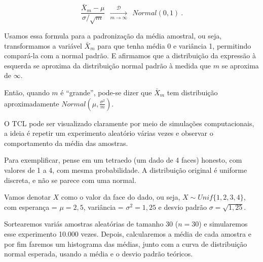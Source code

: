 \documentclass[
]{book}
\begin{document}
\[
\frac{\bar{X}_m-\mu}{\sigma/\sqrt{m}} ~~\xrightarrow[m\rightarrow\infty]{\mathcal{D}}~~ Normal(0,1)~.
\]

Usamos essa formula para a padronização da média amostral, ou seja, transformamos a variável \(\bar{X}_m\) para que tenha média 0 e variância 1, permitindo compará-la com a normal padrão. E afirmamos que a distribuição da expressão à esquerda se aproxima da distribuição normal padrão à medida que \(m\) se aproxima de \(\infty\).

Então, quando \(m\) é ``grande'', pode-se dizer que \(\bar{X}_m\) tem distribuição aproximadamente \(Normal\left(\mu,\frac{\sigma^2}{m}\right)\).

O TCL pode ser visualizado claramente por meio de simulações computacionais, a ideia é repetir um experimento aleatório várias vezes e observar o comportamento da média das amostras.

Para exemplificar, pense em um tetraedo (um dado de 4 faces) honesto, com valores de 1 a 4, com mesma probabilidade. A distribuição original é uniforme discreta, e não se parece com uma normal.

Vamos denotar \(X\) como o valor da face do dado, ou seja, \(X \sim Unif\{1,2,3,4\}\), com esperança = \(\mu = 2,5\), variância = \(\sigma^2 = 1,25\) e desvio padrão \(\sigma = \sqrt{1,25}\).

Sortearemos variás amostras aleatórias de tamanho 30 (\(n=30\)) e simularemos esse experimento 10.000 vezes. Depois, calcularemos a média de cada amostra e por fim faremos um histograma das médias, junto com a curva de distribuição normal esperada, usando a média e o desvio padrão teóricos.
\end{document}
